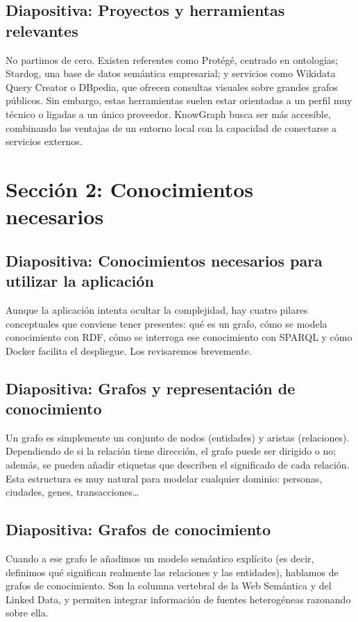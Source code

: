 \documentclass{article}
\begin{document}
\subsection*{Diapositiva: Proyectos y herramientas relevantes}
No partimos de cero. Existen referentes como Protégé, centrado en ontologías; Stardog, una base de datos semántica empresarial; y servicios como Wikidata Query Creator o DBpedia, que ofrecen consultas visuales sobre grandes grafos públicos. Sin embargo, estas herramientas suelen estar orientadas a un perfil muy técnico o ligadas a un único proveedor. KnowGraph busca ser más accesible, combinando las ventajas de un entorno local con la capacidad de conectarse a servicios externos.

\section*{Sección 2: Conocimientos necesarios}

\subsection*{Diapositiva: Conocimientos necesarios para utilizar la aplicación}
Aunque la aplicación intenta ocultar la complejidad, hay cuatro pilares conceptuales que conviene tener presentes: qué es un grafo, cómo se modela conocimiento con RDF, cómo se interroga ese conocimiento con SPARQL y cómo Docker facilita el despliegue. Los revisaremos brevemente.

\subsection*{Diapositiva: Grafos y representación de conocimiento}
Un grafo es simplemente un conjunto de nodos (entidades) y aristas (relaciones). Dependiendo de si la relación tiene dirección, el grafo puede ser dirigido o no; además, se pueden añadir etiquetas que describen el significado de cada relación. Esta estructura es muy natural para modelar cualquier dominio: personas, ciudades, genes, transacciones…

\subsection*{Diapositiva: Grafos de conocimiento}
Cuando a ese grafo le añadimos un modelo semántico explícito (es decir, definimos qué significan realmente las relaciones y las entidades), hablamos de grafos de conocimiento. Son la columna vertebral de la Web Semántica y del Linked Data, y permiten integrar información de fuentes heterogéneas razonando sobre ella.
\end{document}
